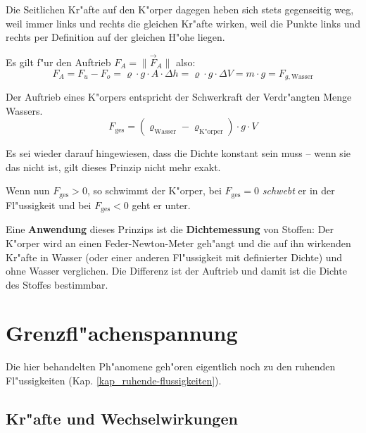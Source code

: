 Die Seitlichen Kr"afte auf den K"orper dagegen heben sich stets
gegenseitig weg, weil immer links und rechts die gleichen Kr"afte
wirken, weil die Punkte links und rechts per Definition auf der
gleichen H"ohe liegen.

Es gilt f"ur den Auftrieb $F_A = \|\vec F_A\|$ also:
\begin{equation}
   \label{eq:61}
   F_A = F_u - F_o =  \varrho \cdot g \cdot A \cdot \Delta h = \varrho
   \cdot g \cdot \Delta V = m \cdot g = F_{g, \text{Wasser}}
\end{equation}
\begin{Wichtig}
Der Auftrieb eines K"orpers entspricht der Schwerkraft der Verdr"angten
Menge Wassers.
$$
F_\text{ges} = (\varrho_\text{Wasser} - \varrho_\text{K"orper}) \cdot
g\cdot V
$$
\end{Wichtig}

Es sei wieder darauf hingewiesen, dass die Dichte konstant sein
muss -- wenn sie das nicht ist, gilt dieses Prinzip  nicht mehr exakt.

Wenn nun $F_\text{ges} > 0$, so schwimmt der K"orper, bei $F_\text{ges} = 0$
\emph{schwebt} er in der Fl"ussigkeit und bei $F_\text{ges} < 0$ geht er unter.

\bigskip

\begin{Beispiel}
Eine \textbf{Anwendung} dieses Prinzips ist die \textbf{Dichtemessung} von
Stoffen: Der K"orper wird an einen Feder-Newton-Meter geh"angt und die
auf ihn wirkenden Kr"afte in Wasser (oder einer anderen Fl"ussigkeit mit
definierter Dichte) und ohne Wasser verglichen. Die Differenz ist der
Auftrieb und damit ist die Dichte des Stoffes bestimmbar.   
\end{Beispiel}





\section{Grenzfl"achenspannung}
\label{kap_grenzflachenspannung}

Die hier behandelten Ph"anomene geh"oren eigentlich noch zu den ruhenden
Fl"ussigkeiten (Kap. \ref{kap_ruhende-flussigkeiten}).




\subsection{Kr"afte und Wechselwirkungen}
\label{kap_krafte-und-wechselwirkungen}



